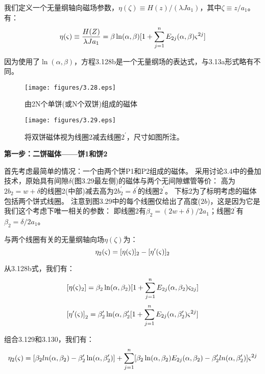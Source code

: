 我们定义一个无量纲轴向磁场参数，$\eta(\zeta)\equiv H(z)/(\lambda J a_1)$，其中$\zeta\equiv z/a_1$。有：
\begin{equation}
\eta(\varsigma)\equiv \frac{H(Z)}{\lambda Ja_{1}}=\beta \ln(\alpha,\beta)[1+\sum_{j=1}^{n} E_{2j}(\alpha,\beta)\varsigma^{2j}]\\%
\end{equation}

因为使用了$\ln(\alpha,\beta)$，方程3.128b是一个无量纲场的表达式，与3.13a形式略有不同。
\begin{figure}[htbp]
	\centering
	\texttt{[image: figures/3.28.eps]}
	\caption{由2N个单饼(或N个双饼)组成的磁体}
\end{figure}

\begin{figure}[htbp]
	\centering
	\texttt{[image: figures/3.29.eps]}
	\caption{将双饼磁体视为线圈2减去线圈$2^\prime$，尺寸如图所注。}
\end{figure}

\textbf{第一步：二饼磁体——饼1和饼2}

首先考虑最简单的情况：一个由两个饼P1和P2组成的磁体。
采用讨论3.4中的叠加技术，原始具有间隙$\delta$(图3.29最左侧)的磁体与两个无间隙螺管等价：
高为$2b_2 = w +\delta$的线圈2(中部)减去高为$2b_2^\prime = \delta^\prime$的线圈$2^\prime$。
下标2为了标明考虑的磁体包括两个饼式线圈。
注意到图3.29中的每个线圈仅给出了高度($2b$)，这是因为它是我们这个考虑下唯一相关的参数：
即线圈2有$\beta_2=(2w+\delta)/2a_1$；线圈$2^\prime$有$\beta_2=\delta/2a_1$。

与两个线圈有关的无量纲轴向场$\eta(\zeta)$为：
\begin{equation}
\eta_{2}(\varsigma)=[\eta(\varsigma)]_{2}-[\eta'(\varsigma)]_{2}\\%
\end{equation}

从3.128b式，我们有：
$$
{[\eta(\varsigma)_{2}]}=\beta_{2}\ln(\alpha,\beta_{2})[1+\sum_{j=1}^{n}E_{2j}(\alpha,\beta_{2})\varsigma_{2j}]\\%
$$
$$
{[\eta'(\varsigma)]}_{2}=\beta'_{2}\ln(\alpha,\beta'_{2}[1+\sum_{j=1}^{n}E_{2j}(\alpha,\beta'_{2})\varsigma^{2j}]\\%
$$

组合3.129和3.130，我们有：
$$
\eta_{2}(\varsigma)=[\beta_{2}ln(\alpha,\beta_{2})-\beta'_{2}\ln(\alpha,\beta'_{2})]\\
+\sum_{j=1}^{n}[\beta_{2}\ln(\alpha,\beta_{2})E_{2j}(\alpha,\beta_{2})-\beta'_{2}ln(\alpha,\beta'_{2})]\varsigma^{2j}%
$$

